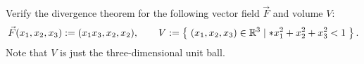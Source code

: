 \documentclass[11pt]{article}
\begin{document}





















    








\begin{exercise}
    Verify the divergence theorem for the following vector field $\vec F$ and volume $V$:
    \begin{gather*}
        \vec F(x_1,x_2,x_3) := ( x_1 x_3, x_2, x_2 ),
        \qquad 
        V := \left\{\; (x_1,x_2,x_3) \in \mathbb R^3 \suchthat* x_1^2 + x_2^2 + x_3^2 < 1 \;\right\}
        .
    \end{gather*}
    Note that $V$ is just the three-dimensional unit ball. 
\end{exercise}
\end{document}
